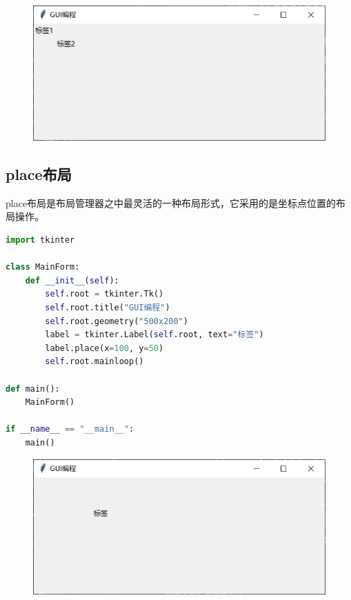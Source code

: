 \begin{tcolorbox}
	\begin{figure}[H]
		\centering
		\includegraphics[]{img/C13/13-3/3.png}
	\end{figure}
\end{tcolorbox}

\vspace{0.5cm}

\subsection{place布局}

place布局是布局管理器之中最灵活的一种布局形式，它采用的是坐标点位置的布局操作。\\


\begin{lstlisting}[language=Python]
import tkinter

class MainForm:
    def __init__(self):
        self.root = tkinter.Tk()
        self.root.title("GUI编程")
        self.root.geometry("500x200")
        label = tkinter.Label(self.root, text="标签")
        label.place(x=100, y=50)
        self.root.mainloop()

def main():
    MainForm()

if __name__ == "__main__":
    main()
\end{lstlisting}

\begin{tcolorbox}
	\begin{figure}[H]
		\centering
		\includegraphics[]{img/C13/13-3/4.png}
	\end{figure}
\end{tcolorbox}

